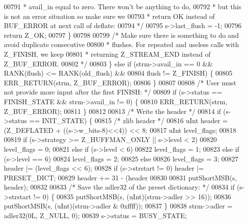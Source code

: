 \begin{DoxyCode}
{00791 \textcolor{comment}{             * avail\_in equal to zero. There won't be anything to do,}
00792 \textcolor{comment}{             * but this is not an error situation so make sure we}
00793 \textcolor{comment}{             * return OK instead of BUF\_ERROR at next call of deflate:}
00794 \textcolor{comment}{             */}
00795             s->last\_flush = -1;
00796             \textcolor{keywordflow}{return} Z\_OK;
00797         \}
00798 
00799     \textcolor{comment}{/* Make sure there is something to do and avoid duplicate consecutive}
00800 \textcolor{comment}{     * flushes. For repeated and useless calls with Z\_FINISH, we keep}
00801 \textcolor{comment}{     * returning Z\_STREAM\_END instead of Z\_BUF\_ERROR.}
00802 \textcolor{comment}{     */}
00803     \} \textcolor{keywordflow}{else} \textcolor{keywordflow}{if} (strm->avail\_in == 0 && RANK(flush) <= RANK(old\_flush) &&
00804                flush != Z\_FINISH) \{
00805         ERR\_RETURN(strm, Z\_BUF\_ERROR);
00806     \}
00807 
00808     \textcolor{comment}{/* User must not provide more input after the first FINISH: */}
00809     \textcolor{keywordflow}{if} (s->status == FINISH\_STATE && strm->avail\_in != 0) \{
00810         ERR\_RETURN(strm, Z\_BUF\_ERROR);
00811     \}
00812 
00813     \textcolor{comment}{/* Write the header */}
00814     \textcolor{keywordflow}{if} (s->status == INIT\_STATE) \{
00815         \textcolor{comment}{/* zlib header */}
00816         uInt header = (Z\_DEFLATED + ((s->w\_bits-8)<<4)) << 8;
00817         uInt level\_flags;
00818 
00819         \textcolor{keywordflow}{if} (s->strategy >= Z\_HUFFMAN\_ONLY || s->level < 2)
00820             level\_flags = 0;
00821         \textcolor{keywordflow}{else} \textcolor{keywordflow}{if} (s->level < 6)
00822             level\_flags = 1;
00823         \textcolor{keywordflow}{else} \textcolor{keywordflow}{if} (s->level == 6)
00824             level\_flags = 2;
00825         \textcolor{keywordflow}{else}
00826             level\_flags = 3;
00827         header |= (level\_flags << 6);
00828         \textcolor{keywordflow}{if} (s->strstart != 0) header |= PRESET\_DICT;
00829         header += 31 - (header %
00830 
00831         putShortMSB(s, header);
00832 
00833         \textcolor{comment}{/* Save the adler32 of the preset dictionary: */}
00834         \textcolor{keywordflow}{if} (s->strstart != 0) \{
00835             putShortMSB(s, (uInt)(strm->adler >> 16));
00836             putShortMSB(s, (uInt)(strm->adler & 0xffff));
00837         \}
00838         strm->adler = adler32(0L, Z\_NULL, 0);
00839         s->status = BUSY\_STATE;
}
\end{DoxyCode}
